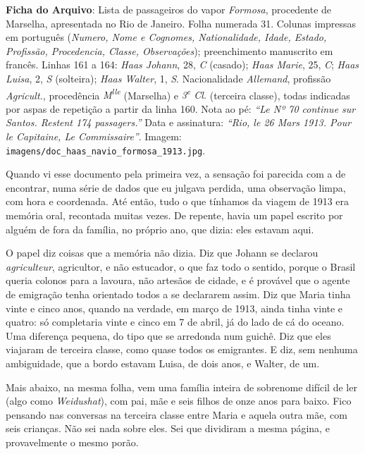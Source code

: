 \documentclass[
  brazilian,
  11pt,
  openany]{book}
\begin{document}
\begin{ficha}

\textbf{Ficha do Arquivo}: Lista de passageiros do vapor \emph{Formosa},
procedente de Marselha, apresentada no Rio de Janeiro. Folha numerada
31. Colunas impressas em português (\emph{Numero, Nome e Cognomes,
Nationalidade, Idade, Estado, Profissão, Procedencia, Classe,
Observações}); preenchimento manuscrito em francês. Linhas 161 a 164:
\emph{Haas Johann}, 28, \emph{C} (casado); \emph{Haas Marie}, 25,
\emph{C}; \emph{Haas Luisa}, 2, \emph{S} (solteira); \emph{Haas Walter},
1, \emph{S}. Nacionalidade \emph{Allemand}, profissão \emph{Agricult.},
procedência \emph{M\textsuperscript{lle}} (Marselha) e
\emph{3\textsuperscript{e} Cl.} (terceira classe), todas indicadas por
aspas de repetição a partir da linha 160. Nota ao pé: \emph{``Le Nº 70
continue sur Santos. Restent 174 passagers.''} Data e assinatura:
\emph{``Rio, le 26 Mars 1913. Pour le Capitaine, Le Commissaire''}.
Imagem: \texttt{imagens/doc\_haas\_navio\_formosa\_1913.jpg}.

\end{ficha}

Quando vi esse documento pela primeira vez, a sensação foi parecida com
a de encontrar, numa série de dados que eu julgava perdida, uma
observação limpa, com hora e coordenada. Até então, tudo o que tínhamos
da viagem de 1913 era memória oral, recontada muitas vezes. De repente,
havia um papel escrito por alguém de fora da família, no próprio ano,
que dizia: eles estavam aqui.

O papel diz coisas que a memória não dizia. Diz que Johann se declarou
\emph{agriculteur}, agricultor, e não estucador, o que faz todo o
sentido, porque o Brasil queria colonos para a lavoura, não artesãos de
cidade, e é provável que o agente de emigração tenha orientado todos a
se declararem assim. Diz que Maria tinha vinte e cinco anos, quando na
verdade, em março de 1913, ainda tinha vinte e quatro: só completaria
vinte e cinco em 7 de abril, já do lado de cá do oceano. Uma diferença
pequena, do tipo que se arredonda num guichê. Diz que eles viajaram de
terceira classe, como quase todos os emigrantes. E diz, sem nenhuma
ambiguidade, que a bordo estavam Luisa, de dois anos, e Walter, de um.

Mais abaixo, na mesma folha, vem uma família inteira de sobrenome
difícil de ler (algo como \emph{Weidushat}), com pai, mãe e seis filhos
de onze anos para baixo. Fico pensando nas conversas na terceira classe
entre Maria e aquela outra mãe, com seis crianças. Não sei nada sobre
eles. Sei que dividiram a mesma página, e provavelmente o mesmo porão.
\end{document}
